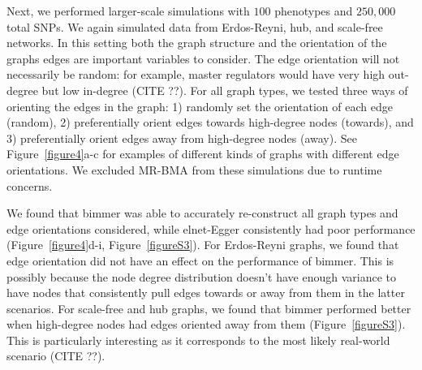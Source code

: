 \documentclass{article}
\begin{document}
Next, we performed larger-scale simulations with $100$ phenotypes and
$250,000$ total SNPs. We again
simulated data from Erdos-Reyni, hub, and scale-free networks. In this setting
both the graph structure and the orientation of the graphs edges are important
variables to consider. The edge orientation will not necessarily be random:
for example, master regulators would have very high out-degree but low in-degree (CITE ??). 
For all graph types, we tested three ways of orienting the edges in the graph:
 1) randomly set the orientation
of each edge (random), 2) preferentially orient edges towards high-degree nodes (towards),
 and 3) preferentially orient edges away from high-degree nodes (away). See
 Figure~\ref{figure4}a-c for examples of different kinds of graphs with
 different edge orientations. We excluded
MR-BMA from these simulations due to runtime concerns.

We found that bimmer was able to accurately re-construct all graph types and edge
orientations considered, while
elnet-Egger consistently had poor performance (Figure~\ref{figure4}d-i, Figure~\ref{figureS3}).
 For Erdos-Reyni graphs, we found that edge orientation did not have an effect on the
 performance of bimmer. This is possibly because the node degree distribution
 doesn't have enough variance to have nodes that consistently pull edges towards
 or away from them in the latter scenarios. For scale-free and hub graphs, we
 found that bimmer performed better when high-degree nodes had edges oriented
 away from them (Figure~\ref{figureS3}). This is particularly interesting as
 it corresponds to the most likely real-world scenario (CITE ??).

\end{document}
